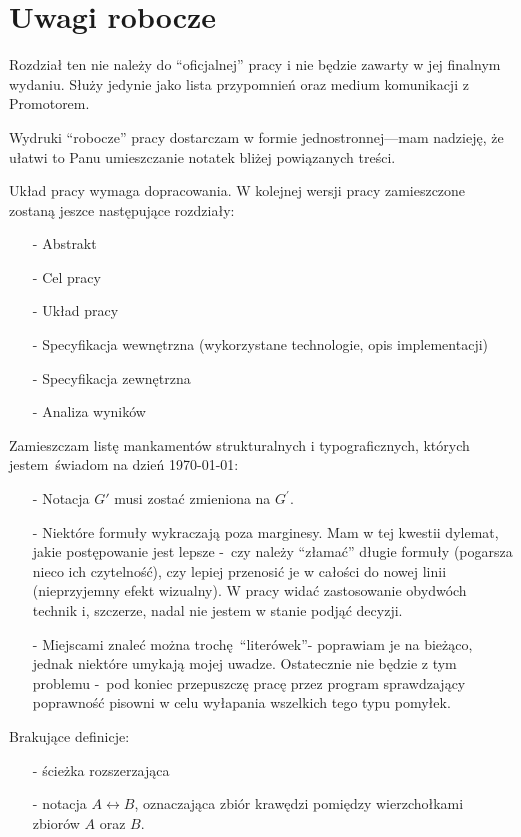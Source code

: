 \chapter{Uwagi robocze}\label{section_notes}
\par{
  Rozdział ten nie należy do ``oficjalnej'' pracy i nie będzie zawarty w jej
 finalnym wydaniu.
 Służy jedynie jako lista przypomnień oraz medium komunikacji z Promotorem.
}
\begin{note}
  Wydruki ``robocze'' pracy dostarczam w formie jednostronnej---mam nadzieję, że
  ułatwi to Panu umieszczanie notatek bliżej powiązanych treści.
\end{note}
\begin{note}
  Układ pracy wymaga dopracowania.
  W kolejnej wersji pracy zamieszczone zostaną jeszce następujące rozdziały:
  \begin{itemize}
    \item[-] Abstrakt
    \item[-] Cel pracy
    \item[-] Układ pracy
    \item[-] Specyfikacja wewnętrzna (wykorzystane technologie, opis
      implementacji)
    \item[-] Specyfikacja zewnętrzna
    \item[-] Analiza wyników
  \end{itemize}
  Zamieszczam listę mankamentów strukturalnych i typograficznych, których 
  jestem świadom na dzień \today:
  \begin{itemize}
    \item[-] Notacja $G\prime$ musi zostać zmieniona na $G^{\prime}$.
    \item[-] Niektóre formuły wykraczają poza marginesy.
      Mam w tej kwestii dylemat, jakie postępowanie jest lepsze -~czy należy
      ``złamać'' długie formuły (pogarsza nieco ich czytelność), czy lepiej 
      przenosić je w całości do nowej linii (nieprzyjemny efekt wizualny).
      W pracy widać zastosowanie obydwóch technik i, szczerze, nadal nie jestem
      w stanie podjąć decyzji.
    \item[-] Miejscami znaleć można trochę ``literówek''- poprawiam je na
      bieżąco, jednak niektóre umykają mojej uwadze.
      Ostatecznie nie będzie z tym problemu -~pod koniec przepuszczę pracę przez
      program sprawdzający poprawność pisowni w celu wyłapania wszelkich tego
      typu pomyłek.
  \end{itemize}
\end{note}
\begin{note}
  Brakujące definicje:
  \begin{itemize}
    \item[-] ścieżka rozszerzająca
    \item[-] notacja $A \leftrightarrow B$, oznaczająca zbiór krawędzi pomiędzy
      wierzchołkami zbiorów $A$ oraz $B$.
  \end{itemize}
\end{note}
